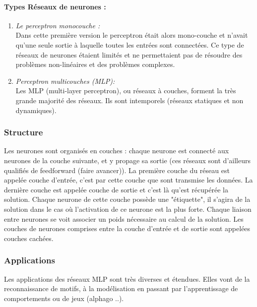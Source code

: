 \documentclass{article}
\begin{document}
			\paragraph{Types Réseaux de neurones :}
				\begin{enumerate}
					\item \emph{Le perceptron monocouche :} \\Dans cette première version le perceptron était alors mono-couche et n'avait qu'une seule sortie à laquelle toutes les entrées sont connectées. Ce type de réseaux de neurones étaient limités et ne permettaient pas de résoudre des problèmes non-linéaires et des problèmes complexes.
					\item \emph{Perceptron multicouches (MLP):} \\Les MLP (multi-layer perceptron), ou réseaux à couches, forment la très grande majorité des réseaux. Ils sont intemporels (réseaux statiques et non dynamiques).
				\end{enumerate}
		\subsubsection{Structure}
			Les neurones sont organisés en couches : chaque neurone est connecté aux neurones de la couche suivante, et y propage sa sortie (ces réseaux sont d'ailleurs qualifiés de feedforward (faire avancer)). La première couche du réseau est appelée couche d'entrée, c'est par cette couche que sont transmise les données. La dernière couche est appelée couche de sortie et c'est là qu'est récupérée la solution. Chaque neurone de cette couche possède une "étiquette", il s'agira de la solution dans le cas où l'activation de ce neurone est la plus forte. Chaque liaison entre neurones se voit associer un poids nécessaire au calcul de la solution. Les couches de neurones comprises entre la couche d'entrée et de sortie sont appelées couches cachées.
		\subsubsection{Applications}
			Les applications des réseaux MLP sont très diverses et étendues. Elles vont de la reconnaissance de motifs, à la modélisation en passant par l'apprentissage de comportements ou de jeux (alphago ..).
\end{document}
